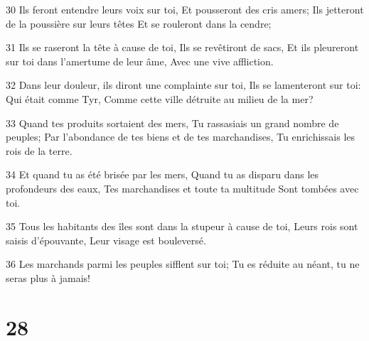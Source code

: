 \par 30 Ils feront entendre leurs voix sur toi, Et pousseront des cris amers; Ils jetteront de la poussière sur leurs têtes Et se rouleront dans la cendre;
\par 31 Ils se raseront la tête à cause de toi, Ils se revêtiront de sacs, Et ils pleureront sur toi dans l'amertume de leur âme, Avec une vive affliction.
\par 32 Dans leur douleur, ils diront une complainte sur toi, Ils se lamenteront sur toi: Qui était comme Tyr, Comme cette ville détruite au milieu de la mer?
\par 33 Quand tes produits sortaient des mers, Tu rassasiais un grand nombre de peuples; Par l'abondance de tes biens et de tes marchandises, Tu enrichissais les rois de la terre.
\par 34 Et quand tu as été brisée par les mers, Quand tu as disparu dans les profondeurs des eaux, Tes marchandises et toute ta multitude Sont tombées avec toi.
\par 35 Tous les habitants des îles sont dans la stupeur à cause de toi, Leurs rois sont saisis d'épouvante, Leur visage est bouleversé.
\par 36 Les marchands parmi les peuples sifflent sur toi; Tu es réduite au néant, tu ne seras plus à jamais!

\chapter{28}


